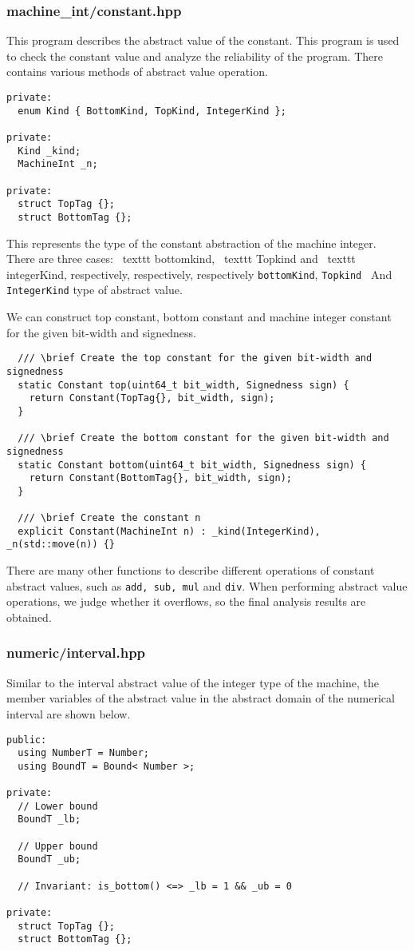 \documentclass[12pt]{article}
\begin{document}
\subsubsection{machine\_int/constant.hpp}
This program describes the abstract value of the constant. This program is used to check the constant value and analyze the reliability of the program. There contains various methods of abstract value operation.
\begin{lstlisting}
private:
  enum Kind { BottomKind, TopKind, IntegerKind };

private:
  Kind _kind;
  MachineInt _n;

private:
  struct TopTag {};
  struct BottomTag {};
\end{lstlisting}
This represents the type of the constant abstraction of the machine integer. There are three cases: \ texttt {bottomkind}, \ texttt {Topkind} and \ texttt {integerKind}, respectively, respectively, respectively \texttt {bottomKind}, \texttt {Topkind } And \texttt {IntegerKind} type of abstract value.

We can construct top constant, bottom constant and machine integer constant for the given bit-width and signedness.
\begin{lstlisting}
  /// \brief Create the top constant for the given bit-width and signedness
  static Constant top(uint64_t bit_width, Signedness sign) {
    return Constant(TopTag{}, bit_width, sign);
  }

  /// \brief Create the bottom constant for the given bit-width and signedness
  static Constant bottom(uint64_t bit_width, Signedness sign) {
    return Constant(BottomTag{}, bit_width, sign);
  }

  /// \brief Create the constant n
  explicit Constant(MachineInt n) : _kind(IntegerKind), _n(std::move(n)) {}
\end{lstlisting}

There are many other functions to describe different operations of constant abstract values, such as \texttt{add, sub, mul} and \texttt{div}. When performing abstract value operations, we judge whether it overflows, so the final analysis results are obtained.

\subsubsection{numeric/interval.hpp}
Similar to the interval abstract value of the integer type of the machine, the member variables of the abstract value in the abstract domain of the numerical interval are shown below.
\begin{lstlisting}
public:
  using NumberT = Number;
  using BoundT = Bound< Number >;

private:
  // Lower bound
  BoundT _lb;

  // Upper bound
  BoundT _ub;

  // Invariant: is_bottom() <=> _lb = 1 && _ub = 0

private:
  struct TopTag {};
  struct BottomTag {};
\end{lstlisting}
\end{document}
